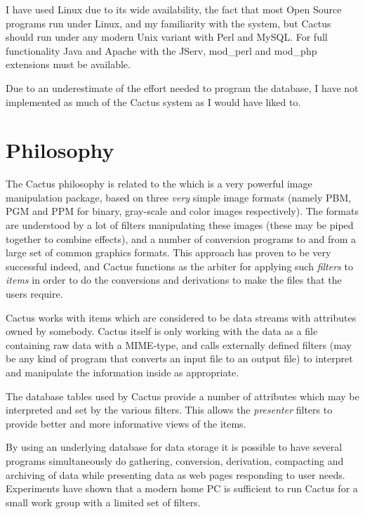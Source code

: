 I have used Linux due to its wide availability, the fact that most
Open Source programs run under Linux, and my familiarity with the
system, but Cactus should run under any modern Unix variant with Perl
and MySQL.  For full functionality Java and Apache with the JServ,
mod_perl and mod_php extensions must be available.

Due to an underestimate of the effort needed to program the
database, I have not implemented as much of
the Cactus system as I would have liked to.

\section{Philosophy}
\label{sec:cactus-philosophy}

The Cactus philosophy is related to the
 which is a very
powerful image manipulation package, based on three
\textit{very} simple image formats (namely PBM, PGM and PPM
for binary, gray-scale and color images respectively).  The
formats are understood by a lot of filters manipulating
these images (these may be piped together to combine
effects), and a number of conversion programs to and from a
large set of common graphics formats.  This approach has
proven to be very successful indeed, and Cactus functions as
the arbiter for applying such \textit{filters} to
\textit{items} in order to do the conversions and
derivations to make the files that the users require.

Cactus works with items which are considered to be data
streams with attributes owned by somebody.  Cactus itself is
only working with the data as a file containing raw data
with a MIME-type, and calls externally defined filters (may
be any kind of program that converts an input file to an
output file) to interpret and manipulate the information
inside as appropriate.

The database tables used by Cactus provide a number of
attributes which may be interpreted and set by the various
filters.  This allows the \textit{presenter} filters to
provide better and more informative views of the items.

By using an underlying database for data storage it is
possible to have several programs simultaneously do
gathering, conversion, derivation, compacting and
archiving of data while presenting data as web pages
responding to user needs. Experiments have shown that a
modern home PC is sufficient to run Cactus for a small work
group with a limited set of filters.

